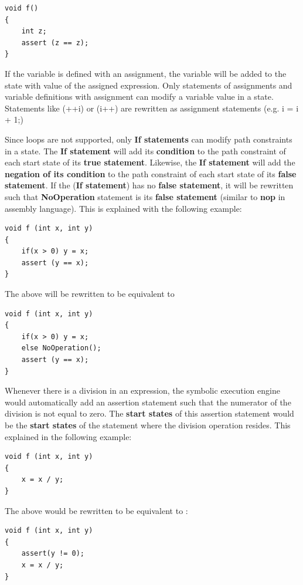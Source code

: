 \documentclass[12pt,a4paper]{article}
\begin{document}

\begin{lstlisting}  
void f()
{
	int z;
	assert (z == z);
}
\end{lstlisting}

If the variable is defined with an assignment, the variable will be added to the state with value of the assigned expression. Only statements of assignments and variable definitions with assignment can modify a variable value in a state. Statements like (++i) or (i++) are rewritten as assignment statements (e.g. i = i + 1;)


Since loops are not supported, only \textbf{If statements} can modify path constraints in a state. The \textbf{If statement} will add its \textbf{condition} to the path constraint of each start state of its \textbf{true statement}. Likewise, the \textbf{If statement} will add the \textbf{negation of its condition} to the path constraint of each start state of its \textbf{false statement}. If the (\textbf{If statement}) has no \textbf{false statement}, it will be rewritten such that \textbf{NoOperation} statement is its \textbf{false statement} (similar to \textbf{nop} in assembly language). This is explained with the following example:

\begin{lstlisting}  
void f (int x, int y) 
{ 
	if(x > 0) y = x;  
	assert (y == x);
}
\end{lstlisting}

The above will be rewritten to be equivalent to 
\begin{lstlisting}  
void f (int x, int y) 
{ 
	if(x > 0) y = x;  
	else NoOperation();
	assert (y == x);
}
\end{lstlisting}

Whenever there is a division in an expression, the symbolic execution engine would automatically add an assertion statement such that the numerator of the division is not equal to zero. The \textbf{start states} of this assertion statement would be the \textbf{start states} of the statement where the division operation resides. This explained in the following example:

\begin{lstlisting}  
void f (int x, int y) 
{
	x = x / y;
}
\end{lstlisting}

The above would be rewritten to be equivalent to :

\begin{lstlisting}  
void f (int x, int y) 
{
	assert(y != 0);
	x = x / y;
}
\end{lstlisting}
\end{document}
